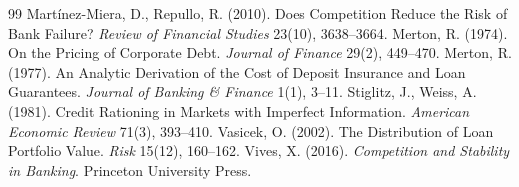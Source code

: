 \begin{thebibliography}{99}
 Martínez-Miera, D., Repullo, R. (2010). Does Competition Reduce the Risk of Bank Failure? \textit{Review of Financial Studies} 23(10), 3638--3664.
 Merton, R. (1974). On the Pricing of Corporate Debt. \textit{Journal of Finance} 29(2), 449--470.
 Merton, R. (1977). An Analytic Derivation of the Cost of Deposit Insurance and Loan Guarantees. \textit{Journal of Banking \& Finance} 1(1), 3--11.
 Stiglitz, J., Weiss, A. (1981). Credit Rationing in Markets with Imperfect Information. \textit{American Economic Review} 71(3), 393--410.
 Vasicek, O. (2002). The Distribution of Loan Portfolio Value. \textit{Risk} 15(12), 160--162.
 Vives, X. (2016). \textit{Competition and Stability in Banking}. Princeton University Press.
\end{thebibliography}
